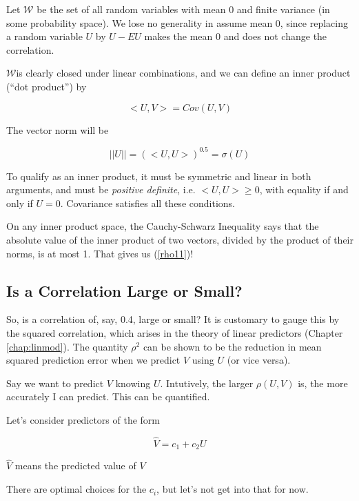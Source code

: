 Let $\mathcal{W}$ be the set of all random variables with mean 0 and
finite variance (in some probability space).  We lose no generality in
assume mean 0, since replacing a random variable $U$ by $U - EU$ makes
the mean 0 and does not change the correlation.

$\mathcal{W}$is clearly closed under linear combinations, and we can
define an inner product (``dot product'') by

\begin{equation}
<U,V> = Cov(U,V)
\end{equation}

The vector norm will be

\begin{equation}
||U|| = (<U,U>)^{0.5} = \sigma(U)
\end{equation}

To qualify as an inner product, it must be symmetric and linear in both
arguments, and must be \textit{positive definite}, i.e. $<U,U> \geq 0$,
with equality if and only if $U = 0$.  Covariance satisfies all these
conditions. 

On any inner product space, the Cauchy-Schwarz Inequality says that the
absolute value of the inner product of two vectors, divided by the
product of their norms, is at most 1.  That gives us (\ref{rho11})!

\subsection{Is a Correlation Large or Small?}
\label{rholargesmall}

So, is a correlation of, say, 0.4, large or small?  It is customary to
gauge this by the squared correlation, which arises in the theory of
linear predictors (Chapter \ref{chap:linmod}).  The quantity $\rho^2$ can be
shown to be the reduction in mean squared prediction error when we
predict $V$ using $U$ (or vice versa).

Say we want to predict $V$ knowing $U$.  Intutively, the larger
$\rho(U,V)$ is, the more accurately I can predict.  This can be quantified.

Let's consider predictors of the form

\begin{equation}
\label{predv}
\widehat{V} = c_1 + c_2 U
\end{equation}

$\widehat{V}$ means the predicted value of $V$

There are optimal choices for the $c_i$, but let's not get into that for
now.

